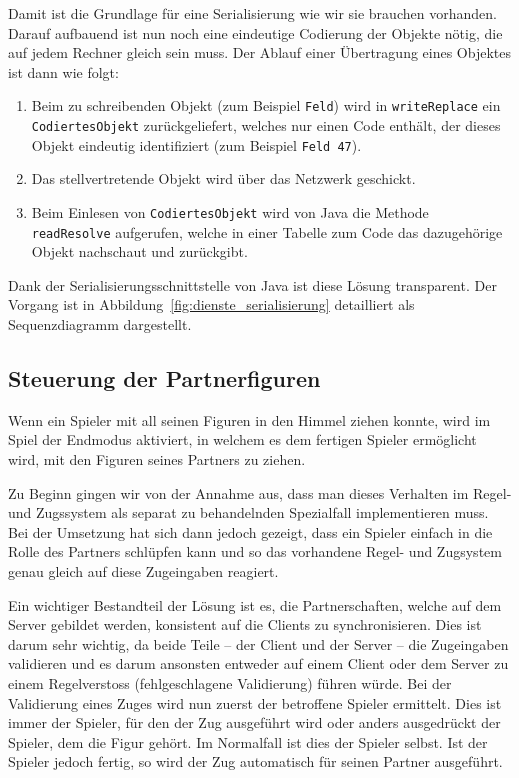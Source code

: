 \documentclass[12pt,halfparskip]{scrartcl}
\begin{document}
Damit ist die Grundlage für eine Serialisierung wie wir sie brauchen vorhanden. Darauf aufbauend ist nun noch eine eindeutige Codierung der Objekte nötig, die auf jedem Rechner gleich sein muss. Der Ablauf einer Übertragung eines Objektes ist dann wie folgt:

\begin{enumerate}
	\item Beim zu schreibenden Objekt (zum Beispiel \texttt{Feld}) wird in \texttt{writeReplace} ein \texttt{CodiertesObjekt} zurückgeliefert, welches nur einen Code enthält, der dieses Objekt eindeutig identifiziert (zum Beispiel \texttt{Feld 47}).
	\item Das stellvertretende Objekt wird über das Netzwerk geschickt.
	\item Beim Einlesen von \texttt{CodiertesObjekt} wird von Java die Methode \texttt{readResolve} aufgerufen, welche in einer Tabelle zum Code das dazugehörige Objekt nachschaut und zurückgibt.
\end{enumerate}

Dank der Serialisierungsschnittstelle von Java ist diese Lösung transparent. Der Vorgang ist in Abbildung~\vref{fig:dienste_serialisierung} detailliert als Sequenzdiagramm dargestellt.

\subsection{Steuerung der Partnerfiguren}

Wenn ein Spieler mit all seinen Figuren in den Himmel ziehen konnte, wird im Spiel der Endmodus aktiviert, in welchem es dem fertigen Spieler ermöglicht wird, mit den Figuren seines Partners zu ziehen.

Zu Beginn gingen wir von der Annahme aus, dass man dieses Verhalten im Regel- und Zugssystem als separat zu behandelnden Spezialfall implementieren muss. Bei der Umsetzung hat sich dann jedoch gezeigt, dass ein Spieler einfach in die Rolle des Partners schlüpfen kann und so das vorhandene Regel- und Zugsystem genau gleich auf diese Zugeingaben reagiert.

Ein wichtiger Bestandteil der Lösung ist es, die Partnerschaften, welche auf dem Server gebildet werden, konsistent auf die Clients zu synchronisieren. Dies ist darum sehr wichtig, da beide Teile -- der Client und der Server -- die Zugeingaben validieren und es darum ansonsten entweder auf einem Client oder dem Server zu einem Regelverstoss (fehlgeschlagene Validierung) führen würde. Bei der Validierung eines Zuges wird nun zuerst der betroffene Spieler ermittelt. Dies ist immer der Spieler, für den der Zug ausgeführt wird oder anders ausgedrückt der Spieler, dem die Figur gehört. Im Normalfall ist dies der Spieler selbst. Ist der Spieler jedoch fertig, so wird der Zug automatisch für seinen Partner ausgeführt.
\end{document}
